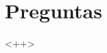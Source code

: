 \documentclass[../main.tex]{subfiles}
\begin{document}
\section{Preguntas}%
\label{sec:preguntas}

\thispagestyle{fancy}

<++>
\end{document}
